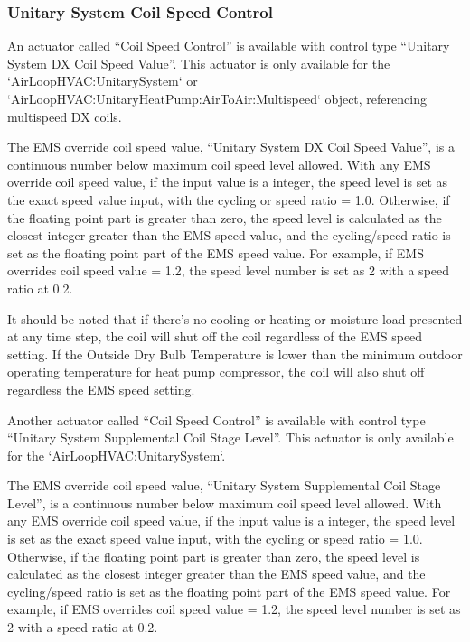 \subsubsection{Unitary System Coil Speed Control}\label{unitary-system-coil-speed-ctrl}

An actuator called ``Coil Speed Control'' is available with control type ``Unitary System DX Coil Speed Value''. This actuator is only available for the `AirLoopHVAC:UnitarySystem` or `AirLoopHVAC:UnitaryHeatPump:AirToAir:Multispeed` object, referencing multispeed DX coils.

The EMS override coil speed value, “Unitary System DX Coil Speed Value”, is a continuous number below maximum coil speed level allowed. With any EMS override coil speed value, if the input value is a integer, the speed level is set as the exact speed value input, with the cycling or speed ratio = 1.0. Otherwise, if the floating point part is greater than zero, the speed level is calculated as the closest integer greater than the EMS speed value, and the cycling/speed ratio is set as the floating point part of the EMS speed value. For example, if EMS overrides coil speed value = 1.2, the speed level number is set as 2 with a speed ratio at 0.2.

It should be noted that if there's no cooling or heating or moisture load presented at any time step, the coil will shut off the coil regardless of the EMS speed setting. If the Outside Dry Bulb Temperature is lower than the minimum outdoor operating temperature for heat pump compressor, the coil will also shut off regardless the EMS speed setting.

Another actuator called ``Coil Speed Control'' is available with control type ``Unitary System Supplemental Coil Stage Level''. This actuator is only available for the `AirLoopHVAC:UnitarySystem`.

The EMS override coil speed value, “Unitary System Supplemental Coil Stage Level”, is a continuous number below maximum coil speed level allowed. With any EMS override coil speed value, if the input value is a integer, the speed level is set as the exact speed value input, with the cycling or speed ratio = 1.0. Otherwise, if the floating point part is greater than zero, the speed level is calculated as the closest integer greater than the EMS speed value, and the cycling/speed ratio is set as the floating point part of the EMS speed value. For example, if EMS overrides coil speed value = 1.2, the speed level number is set as 2 with a speed ratio at 0.2.

